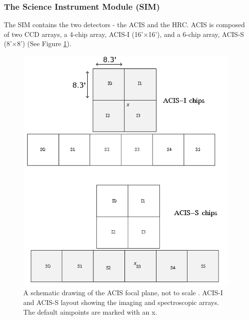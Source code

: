 \subsubsection{The Science Instrument Module (SIM)}
The SIM contains the two detectors - the ACIS and the HRC. ACIS is composed of two CCD arrays, a 4-chip array, ACIS-I (16'$\times$16'), and a 6-chip array, ACIS-S (8'$\times$8') (See Figure \ref{fig:ACIS}).   


\begin{figure}[ht]
\centering
  \includegraphics[scale = 0.5]{Chapters/Figures/acis_def_chips_2.png}
  \caption{A schematic drawing of the ACIS focal plane, not to scale \citep{ChandraMSFC}. ACIS-I and ACIS-S layout showing the imaging and spectroscopic arrays. The default aimpoints are marked with an x.}
  \label{fig:ACIS}
\end{figure}


